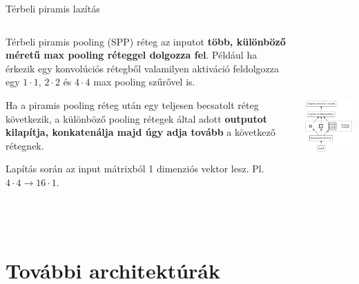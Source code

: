 \documentclass[english, aspectratio=169]{beamer}
\makeatletter
\let\origtableofcontents=\tableofcontents
\def\tableofcontents{\@ifnextchar[{\origtableofcontents}{\gobbletableofcontents}}
\def\gobbletableofcontents#1{\origtableofcontents}
\makeatother
\begin{document}
\begin{frame}{Térbeli piramis lazítás}
\begin{columns}
\begin{column}{.5\textwidth}
Térbeli piramis pooling (SPP) réteg az inputot \textbf{több, különböző méretű max pooling réteggel dolgozza fel}. Például ha érkezik egy konvolúciós rétegből valamilyen aktiváció feldolgozza egy $1 \cdot 1$, $2 \cdot 2$ és $4 \cdot 4$ max pooling szűrővel is.\par\smallskip
Ha a piramis pooling réteg után egy teljesen becsatolt réteg következik, a különböző pooling rétegek által adott \textbf{outputot kilapítja, konkatenálja majd úgy adja tovább} a következő rétegnek.\par\smallskip
Lapítás során az input mátrixból 1 dimenziós vektor lesz. Pl. $4 \cdot 4 \rightarrow 16 \cdot 1$.
\end{column}
\begin{column}{.5\textwidth}
\begin{center}
\includegraphics[height=7cm, keepaspectratio]{graphs/od_4.png}
\end{center}
\end{column}
\end{columns}
\end{frame}

\section{További architektúrák}

\begin{frame}
\tableofcontents[currentsection]
\end{frame}
\end{document}
